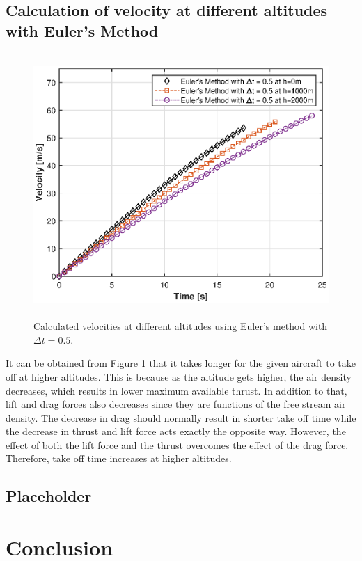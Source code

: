\documentclass[letterpaper,12pt]{article}
\begin{document}
\subsection{Calculation of velocity at different altitudes with Euler's Method }
\begin{figure}[ht]
        \centering \includegraphics[max height=10cm]{graphs/altitude.eps}
        \caption{Calculated velocities at different altitudes using Euler's method with $\Delta t = 0.5$.}
        \label{fig:altitude}
\end{figure}

It can be obtained from Figure \ref{fig:altitude} that it takes longer for the given aircraft to take off at higher altitudes. 
This is because as the altitude gets higher, the air density decreases, which results in lower maximum available
thrust. In addition to that, lift and drag forces also decreases since they are functions of the free stream
air density. The decrease in drag should normally result in shorter take off time while the decrease in thrust and lift force acts exactly the opposite way. However, 
the effect of both the lift force and the thrust overcomes the effect of the drag force. Therefore, take off time increases at higher altitudes.

\subsection{Placeholder}

\section{Conclusion}
\end{document}

